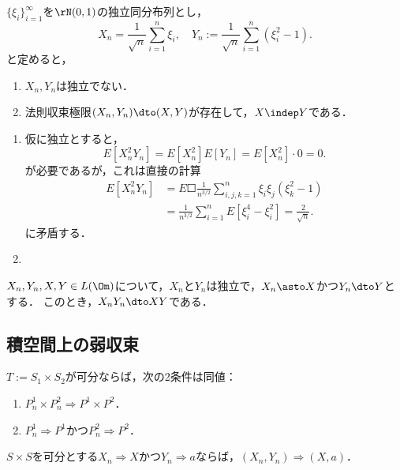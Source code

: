 \documentclass[uplatex,dvipdfmx]{jsreport}
\begin{document}
\begin{example}
    $\{\xi_i\}_{i=1}^\infty$を$\rN(0,1)$の独立同分布列とし，
    \[X_n=\frac{1}{\sqrt{n}}\sum_{i=1}^n\xi_i,\quad Y_n:=\frac{1}{\sqrt{n}}\sum_{i=1}^n(\xi_i^2-1).\]
    と定めると，
    \begin{enumerate}
        \item $X_n,Y_n$は独立でない．
        \item 法則収束極限$(X_n,Y_n)\dto(X,Y)$が存在して，$X\indep Y$である．
    \end{enumerate}
\end{example}
\begin{Proof}\mbox{}
    \begin{enumerate}
        \item 仮に独立とすると，
        \[E[X_n^2Y_n]=E[X_n^2]E[Y_n]=E[X_n^2]\cdot 0=0.\]
        が必要であるが，これは直接の計算
        \begin{align*}
            E[X_n^2Y_n]&=E\Square{\frac{1}{n^{3/2}}\sum_{i,j,k=1}^n\xi_i\xi_j(\xi_k^2-1)}\\
            &=\frac{1}{n^{3/2}}\sum_{i=1}^nE[\xi^4_i-\xi^2_i]=\frac{2}{\sqrt{n}}.
        \end{align*}
        に矛盾する．
        \item 
    \end{enumerate}
\end{Proof}

\begin{proposition}
    $X_n,Y_n,X,Y\in L(\Om)$について，$X_n$と$Y_n$は独立で，$X_n\asto X$かつ$Y_n\dto Y$とする．
    このとき，$X_nY_n\dto XY$である．
\end{proposition}

\subsection{積空間上の弱収束}

\begin{theorem}
    $T:=S_1\times S_2$が可分ならば，次の2条件は同値：
    \begin{enumerate}
        \item $P^1_n\times P^2_n\Rightarrow P^1\times P^2$．
        \item $P^1_n\Rightarrow P^1$かつ$P^2_n\Rightarrow P^2$．
    \end{enumerate}
\end{theorem}

\begin{theorem}
    $S\times S$を可分とする$X_n\Rightarrow X$かつ$Y_n\Rightarrow a$ならば，$(X_n,Y_n)\Rightarrow(X,a)$．
\end{theorem}
\end{document}
